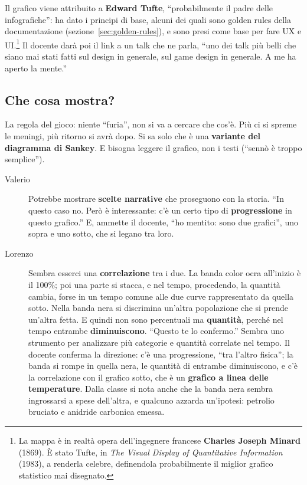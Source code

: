 Il grafico viene attribuito a \textbf{Edward Tufte}, ``probabilmente il padre
delle infografiche'': ha dato i principi di base, alcuni dei quali sono
golden rules della documentazione (sezione~\ref{sec:golden-rules}), e sono
presi come base per fare UX e UI.\footnote{La mappa è in realtà opera
dell'ingegnere francese \textbf{Charles Joseph Minard} (1869). È stato Tufte,
in \emph{The Visual Display of Quantitative Information} (1983), a renderla
celebre, definendola probabilmente il miglior grafico statistico mai
disegnato.} Il docente darà poi il link a un talk che ne parla, ``uno dei
talk più belli che siano mai stati fatti sul design in generale, sul game
design in generale. A me ha aperto la mente.''

\subsection{Che cosa mostra?}

La regola del gioco: niente ``furia'', non si va a cercare che cos'è. Più ci
si spreme le meningi, più ritorno si avrà dopo. Si sa solo che è una
\textbf{variante del diagramma di Sankey}. E bisogna leggere il grafico, non i
testi (``sennò è troppo semplice'').

\begin{description}
  \item[Valerio] Potrebbe mostrare \textbf{scelte narrative} che proseguono
        con la storia. ``In questo caso no. Però è interessante: c'è un
        certo tipo di \textbf{progressione} in questo grafico.'' E, ammette il
        docente, ``ho mentito: sono due grafici'', uno sopra e uno sotto, che
        si legano tra loro.
  \item[Lorenzo] Sembra esserci una \textbf{correlazione} tra i due. La
        banda color ocra all'inizio è il 100\%; poi una parte si stacca, e
        nel tempo, procedendo, la quantità cambia, forse in un tempo comune
        alle due curve rappresentato da quella sotto. Nella banda nera si
        discrimina un'altra popolazione che si prende un'altra fetta. E
        quindi non sono percentuali ma \textbf{quantità}, perché nel tempo
        entrambe \textbf{diminuiscono}. ``Questo te lo confermo.'' Sembra uno
        strumento per analizzare più categorie e quantità correlate nel
        tempo. Il docente conferma la direzione: c'è una progressione,
        ``tra l'altro fisica''; la banda si rompe in quella nera, le
        quantità di entrambe diminuiscono, e c'è la correlazione con il
        grafico sotto, che è un \textbf{grafico a linea delle temperature}.
        Dalla classe si nota anche che la banda nera sembra ingrossarsi a
        spese dell'altra, e qualcuno azzarda un'ipotesi: petrolio bruciato e
        anidride carbonica emessa.
\end{description}

